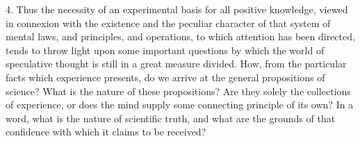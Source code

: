 \documentclass[oneside]{book}
\begin{document}
4. Thus the necessity of an experimental basis for all positive
knowledge, viewed in connexion with the existence and the
peculiar character of that system of mental laws, and principles,
and operations, to which attention has been directed, tends to
throw light upon some important questions by which the world
of speculative thought is still in a great measure divided. How,
from the particular facts which experience presents, do we arrive
at the general propositions of science? What is the nature of
these propositions? Are they solely the collections of experience, or does the mind supply some connecting principle of its
own? In a word, what is the nature of scientific truth, and
what are the grounds of that confidence with which it claims to
be received?
\end{document}
